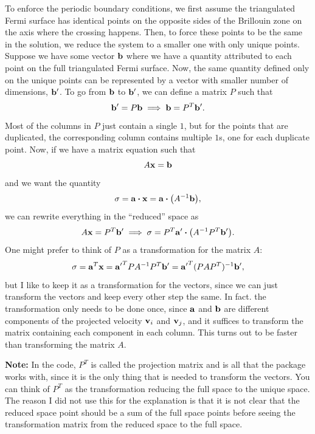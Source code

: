 \documentclass[12pt]{article}
\begin{document}
To enforce the periodic boundary conditions, we first assume the triangulated Fermi surface
has identical points on the opposite sides of the Brillouin zone on the axis where the crossing
happens. Then, to force these points to be the same in the solution, we reduce the system to
a smaller one with only unique points. Suppose we have some vector $\vb{b}$ where we have a
quantity attributed to each point on the full triangulated Fermi surface. Now, the same quantity
defined only on the unique points can be represented by a vector with smaller number of dimensions,
$\vb{b'}$. To go from $\vb{b}$ to $\vb{b'}$, we can define a matrix $P$ such that
\begin{equation}
    \vb{b'} = P\vb{b} \implies \vb{b} = P^T\vb{b'}.
\end{equation}
Most of the columns in $P$ just contain a single $1$, but for the points that are duplicated,
the corresponding column contains multiple $1$s, one for each duplicate point. Now, if we have
a matrix equation such that
\begin{equation}
    A\vb{x} = \vb{b}
\end{equation}
and we want the quantity
\begin{equation}
    \sigma = \vb{a}\vdot\vb{x} = \vb{a}\vdot\qty(A^{-1}\vb{b}),
\end{equation}
we can rewrite everything in the ``reduced'' space as
\begin{equation}
    A\vb{x} = P^T\vb{b'} \implies \sigma = P^T\vb{a'}\vdot\qty(A^{-1}P^T\vb{b'}).
\end{equation}
One might prefer to think of $P$ as a transformation for the matrix $A$:
\begin{equation}
    \sigma = \vb{a}^T\vb{x} = \vb{a'}^T P A^{-1} P^T \vb{b'} = \vb{a'}^T (P A P^T)^{-1} \vb{b'}, 
\end{equation}
but I like to keep it as a transformation for the vectors, since we can just transform the vectors
and keep every other step the same. In fact. the transformation only needs to be done once, since
$\vb{a}$ and $\vb{b}$ are different components of the projected velocity $\vb{v}_i$ and $\vb{v}_j$,
and it suffices to transform the matrix containing each component in each column. This turns out
to be faster than transforming the matrix $A$.

\textbf{Note:} In the code, $P^T$ is called the projection matrix and is all that the package works
with, since it is the only thing that is needed to transform the vectors. You can think of $P^T$
as the transformation reducing the full space to the unique space. The reason I did not use this
for the explanation is that it is not clear that the reduced space point should be a sum of the
full space points before seeing the transformation matrix from the reduced space to the full space.
\end{document}
